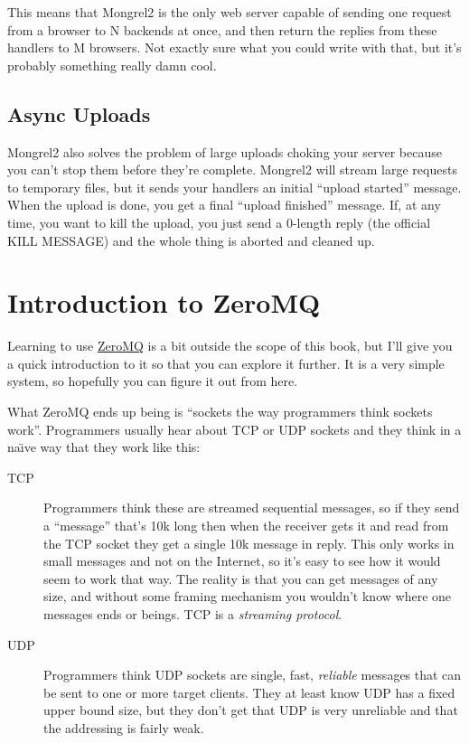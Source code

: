 This means that Mongrel2 is the only web server capable of sending one request
from a browser to N backends at once, and then return the replies from these
handlers to M browsers.  Not exactly sure what you could write with that, but
it's probably something really damn cool.

\subsection{Async Uploads}

Mongrel2 also solves the problem of large uploads choking your server
because you can't stop them before they're complete.  Mongrel2 will stream
large requests to temporary files, but it sends your handlers an initial
``upload started'' message.  When the upload is done, you get a final ``upload 
finished'' message.  If, at any time, you want to kill the upload, you just
send a 0-length reply (the official KILL MESSAGE) and the whole thing is
aborted and cleaned up.


\section{Introduction to ZeroMQ}

Learning to use \href{http://zeromq.org}{ZeroMQ} is a bit outside the scope of this book, but I'll give you
a quick introduction to it so that you can explore it further.  It is a very simple
system, so hopefully you can figure it out from here.

What ZeroMQ ends up being is ``sockets the way programmers think sockets work''.  Programmers
usually hear about TCP or UDP sockets and they think in a na{\"\i}ve way that they work like
this:

\begin{description}
\item [TCP] Programmers think these are streamed sequential messages, so if
   they send a ``message'' that's 10k long then when the receiver gets it and read
   from the TCP socket they get a single 10k message in reply.  This only works in
   small messages and not on the Internet, so it's easy to see how it would seem
   to work that way.  The reality is that you can get messages of any size, and without
   some framing mechanism you wouldn't know where one messages ends or beings.
   TCP is a \emph{streaming protocol}.

\item [UDP] Programmers think UDP sockets are single, fast, \emph{reliable} messages
    that can be sent to one or more target clients.  They at least know UDP has a fixed
    upper bound size, but they don't get that UDP is very unreliable and that the addressing
    is fairly weak.
\end{description}

